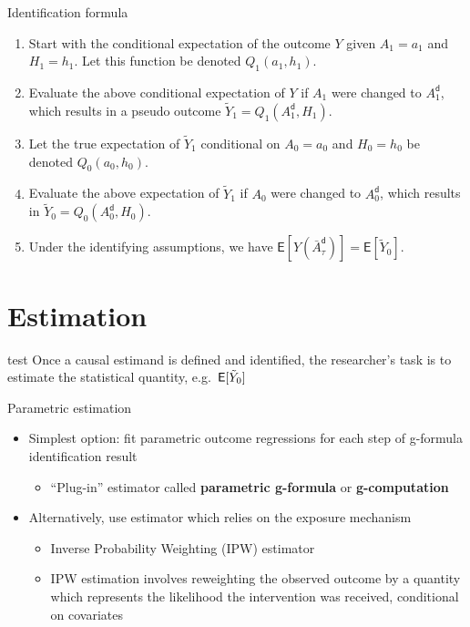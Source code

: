 \documentclass[
  10pt,
  ignorenonframetext,
]{beamer}
\providecommand{\tightlist}{%
  \setlength{\itemsep}{0pt}\setlength{\parskip}{0pt}}\usepackage{longtable,booktabs,array}
\begin{document}
\begin{frame}{Identification formula}
\protect\hypertarget{identification-formula}{}
\begin{enumerate}

\item Start with the conditional expectation of the outcome $Y$ given $A_1=a_1$ and $H_1=h_1$. Let this function be denoted $Q_1(a_1, h_1)$.
\item Evaluate the above conditional 
  expectation of $Y$ if $A_1$ were changed to $A^\mathsf{d}_1$, which results in 
  a pseudo outcome $\tilde Y_1=Q_1(A^\mathsf{d}_1, H_1)$.
\item Let the true expectation of $\tilde Y_1$ conditional on
  $A_0=a_0$ and $H_0=h_0$ be denoted $Q_0(a_0, h_0)$.
\item Evaluate the above
  expectation of $\tilde Y_1$ if $A_0$ were changed to $A^\mathsf{d}_0$, which results in
  $\tilde Y_0=Q_0(A^\mathsf{d}_0, H_0)$.
\item Under the identifying assumptions, we have
  $\mathsf{E}[Y(\bar{A}_\tau^\mathsf{d})]=\mathsf{E}[\tilde Y_0]$.
  
\end{enumerate}
\end{frame}

\hypertarget{estimation}{%
\section{Estimation}\label{estimation}}

\begin{frame}{test}
\protect\hypertarget{test}{}
Once a causal estimand is defined and identified, the researcher's task
is to estimate the statistical quantity,
e.g.~\(\mathsf{E}[\Tilde{Y}_0]\)
\end{frame}

\begin{frame}{Parametric estimation}
\protect\hypertarget{parametric-estimation}{}
\begin{itemize}
\tightlist
\item
  Simplest option: fit parametric outcome regressions for each step of
  g-formula identification result

  \begin{itemize}
  \tightlist
  \item
    ``Plug-in'' estimator called \textbf{parametric g-formula} or
    \textbf{g-computation}
  \end{itemize}
\item
  Alternatively, use estimator which relies on the exposure mechanism

  \begin{itemize}
  \tightlist
  \item
    Inverse Probability Weighting (IPW) estimator
  \item
    IPW estimation involves reweighting the observed outcome by a
    quantity which represents the likelihood the intervention was
    received, conditional on covariates
  \end{itemize}
\end{itemize}
\end{frame}
\end{document}

